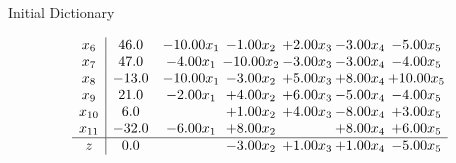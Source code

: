 \documentclass[8pt]{article}
\begin{document}
Initial Dictionary 

\[\begin{array}{c| c c@{\hskip 2pt} c@{\hskip 2pt} c@{\hskip 2pt} c@{\hskip 2pt} c@{\hskip 2pt} }
 x_{6}   &  46.0 & -10.00 x_{1} & -1.00 x_{2} & +  2.00 x_{3} & -3.00 x_{4} & -5.00 x_{5}\\
 x_{7}   &  47.0 & -4.00 x_{1} & -10.00 x_{2} & -3.00 x_{3} & -3.00 x_{4} & -4.00 x_{5}\\
 x_{8}   &  -13.0 & -10.00 x_{1} & -3.00 x_{2} & +  5.00 x_{3} & +  8.00 x_{4} & + 10.00 x_{5}\\
 x_{9}   &  21.0 & -2.00 x_{1} & +  4.00 x_{2} & +  6.00 x_{3} & -5.00 x_{4} & -4.00 x_{5}\\
 x_{10}   &  6.0  &   & +  1.00 x_{2} & +  4.00 x_{3} & -8.00 x_{4} & +  3.00 x_{5}\\
 x_{11}   &  -32.0 & -6.00 x_{1} & +  8.00 x_{2} &   & +  8.00 x_{4} & +  6.00 x_{5}\\
\hline
z    &  0.0  &   & -3.00 x_{2} & +  1.00 x_{3} & +  1.00 x_{4} & -5.00 x_{5}\\
\end{array}\]
\end{document}
